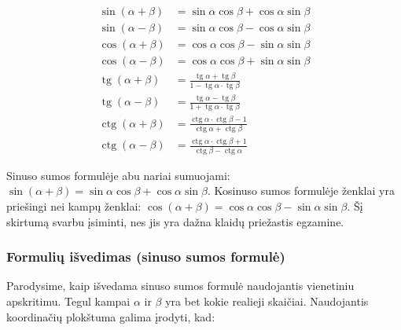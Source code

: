 \begin{tcolorbox}[colback=blue!5!white, colframe=blue!60!black,
    title=Pagrindinės sumos ir skirtumo formulės]
\begin{align}
  \sin(\alpha + \beta) &= \sin\alpha\cos\beta + \cos\alpha\sin\beta \\
  \sin(\alpha - \beta) &= \sin\alpha\cos\beta - \cos\alpha\sin\beta \\
  \cos(\alpha + \beta) &= \cos\alpha\cos\beta - \sin\alpha\sin\beta \\
  \cos(\alpha - \beta) &= \cos\alpha\cos\beta + \sin\alpha\sin\beta \\[6pt]
  \operatorname{tg}(\alpha + \beta) &=
      \frac{\operatorname{tg}\alpha + \operatorname{tg}\beta}
           {1 - \operatorname{tg}\alpha\cdot\operatorname{tg}\beta} \\[6pt]
  \operatorname{tg}(\alpha - \beta) &=
      \frac{\operatorname{tg}\alpha - \operatorname{tg}\beta}
           {1 + \operatorname{tg}\alpha\cdot\operatorname{tg}\beta} \\[6pt]
  \operatorname{ctg}(\alpha + \beta) &=
      \frac{\operatorname{ctg}\alpha\cdot\operatorname{ctg}\beta - 1}
           {\operatorname{ctg}\alpha + \operatorname{ctg}\beta} \\[6pt]
  \operatorname{ctg}(\alpha - \beta) &=
      \frac{\operatorname{ctg}\alpha\cdot\operatorname{ctg}\beta + 1}
           {\operatorname{ctg}\beta - \operatorname{ctg}\alpha}
\end{align}
\end{tcolorbox}

\begin{remark}
  Sinuso sumos formulėje abu nariai sumuojami:
  \(\sin(\alpha+\beta) = \sin\alpha\cos\beta + \cos\alpha\sin\beta\).
  Kosinuso sumos formulėje ženklai yra priešingi nei kampų ženklai:
  \(\cos(\alpha+\beta) = \cos\alpha\cos\beta - \sin\alpha\sin\beta\).
  Šį skirtumą svarbu įsiminti, nes jis yra dažna klaidų priežastis egzamine.
\end{remark}

\subsubsection*{Formulių išvedimas (sinuso sumos formulė)}

Parodysime, kaip išvedama sinuso sumos formulė naudojantis vienetiniu
apskritimu. Tegul kampai $\alpha$ ir $\beta$ yra bet kokie realieji skaičiai.
Naudojantis koordinačių plokštuma galima įrodyti, kad:

